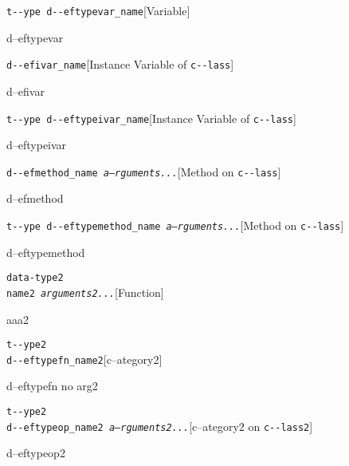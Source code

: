 \documentclass{book}
\begin{document}
\begin{titlepage}
\noindent\texttt{t{-}{-}ype d{-}{-}eftypevar\_name}\hfill[Variable]



%
d--eftypevar

\noindent\texttt{d{-}{-}efivar\_name}\hfill[Instance Variable of \texttt{c{-}{-}lass}]



%
d--efivar

\noindent\texttt{t{-}{-}ype d{-}{-}eftypeivar\_name}\hfill[Instance Variable of \texttt{c{-}{-}lass}]



%
d--eftypeivar

\noindent\texttt{d{-}{-}efmethod\_name \bgroup{}\normalfont{}\textsl{a--rguments...}\egroup{}}\hfill[Method on \texttt{c{-}{-}lass}]



%
d--efmethod

\noindent\texttt{t{-}{-}ype d{-}{-}eftypemethod\_name \bgroup{}\normalfont{}\textsl{a--rguments...}\egroup{}}\hfill[Method on \texttt{c{-}{-}lass}]



%
d--eftypemethod


\noindent\texttt{data-type2\leavevmode{}\\name2 \bgroup{}\normalfont{}\textsl{arguments2...}\egroup{}}\hfill[Function]



%
aaa2

\noindent\texttt{t{-}{-}ype2\leavevmode{}\\d{-}{-}eftypefn\_name2}\hfill[c--ategory2]



%
d--eftypefn no arg2

\noindent\texttt{t{-}{-}ype2\leavevmode{}\\d{-}{-}eftypeop\_name2 \bgroup{}\normalfont{}\textsl{a--rguments2...}\egroup{}}\hfill[c--ategory2 on \texttt{c{-}{-}lass2}]



%
d--eftypeop2


\end{titlepage}
\end{document}

